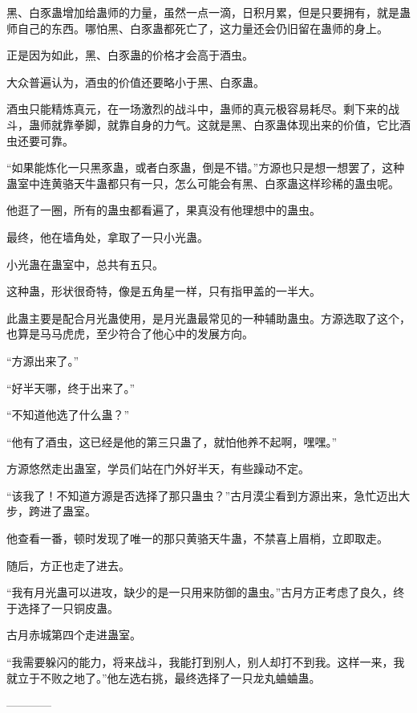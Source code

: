 \begin{this_body}
黑、白豕蛊增加给蛊师的力量，虽然一点一滴，日积月累，但是只要拥有，就是蛊师自己的东西。哪怕黑、白豕蛊都死亡了，这力量还会仍旧留在蛊师的身上。

正是因为如此，黑、白豕蛊的价格才会高于酒虫。

大众普遍认为，酒虫的价值还要略小于黑、白豕蛊。

酒虫只能精炼真元，在一场激烈的战斗中，蛊师的真元极容易耗尽。剩下来的战斗，蛊师就靠拳脚，就靠自身的力气。这就是黑、白豕蛊体现出来的价值，它比酒虫还要可靠。

“如果能炼化一只黑豕蛊，或者白豕蛊，倒是不错。”方源也只是想一想罢了，这种蛊室中连黄骆天牛蛊都只有一只，怎么可能会有黑、白豕蛊这样珍稀的蛊虫呢。

他逛了一圈，所有的蛊虫都看遍了，果真没有他理想中的蛊虫。

最终，他在墙角处，拿取了一只小光蛊。

小光蛊在蛊室中，总共有五只。

这种蛊，形状很奇特，像是五角星一样，只有指甲盖的一半大。

此蛊主要是配合月光蛊使用，是月光蛊最常见的一种辅助蛊虫。方源选取了这个，也算是马马虎虎，至少符合了他心中的发展方向。

“方源出来了。”

“好半天哪，终于出来了。”

“不知道他选了什么蛊？”

“他有了酒虫，这已经是他的第三只蛊了，就怕他养不起啊，嘿嘿。”

方源悠然走出蛊室，学员们站在门外好半天，有些躁动不定。

“该我了！不知道方源是否选择了那只蛊虫？”古月漠尘看到方源出来，急忙迈出大步，跨进了蛊室。

他查看一番，顿时发现了唯一的那只黄骆天牛蛊，不禁喜上眉梢，立即取走。

随后，方正也走了进去。

“我有月光蛊可以进攻，缺少的是一只用来防御的蛊虫。”古月方正考虑了良久，终于选择了一只铜皮蛊。

古月赤城第四个走进蛊室。

“我需要躲闪的能力，将来战斗，我能打到别人，别人却打不到我。这样一来，我就立于不败之地了。”他左选右挑，最终选择了一只龙丸蛐蛐蛊。

------------

\end{this_body}

